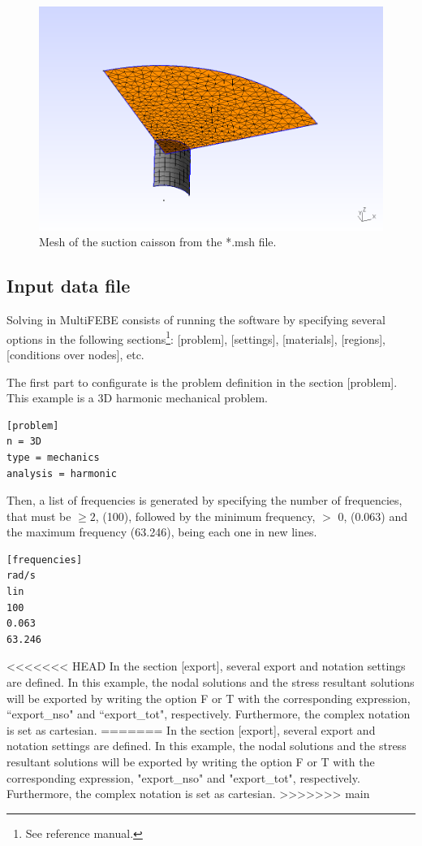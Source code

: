 \documentclass[a4]{article}
\begin{document}
\begin{figure}[tbh!]
	\centering
	\includegraphics[scale=0.6]{mesh.png}
	\caption{Mesh of the suction caisson from the *.msh file.}
	\label{fig:mesh}
\end{figure}

\subsection{Input data file}
Solving in MultiFEBE consists of running the software by specifying several options in the following sections\footnote{See reference manual.}: [problem], [settings], [materials], [regions], [conditions over nodes], etc.

The first part to configurate is the problem definition in the section [problem]. This example is a 3D harmonic mechanical problem.

\begin{Verbatim}	
[problem]
n = 3D
type = mechanics
analysis = harmonic
\end{Verbatim}

Then, a list of frequencies is generated by specifying the number of frequencies, that must be $\geq 2$, (100), followed by the minimum frequency, $>$ 0, (0.063) and the maximum frequency (63.246), being each one in new lines.

\begin{Verbatim}
[frequencies]
rad/s
lin
100
0.063
63.246
\end{Verbatim}

<<<<<<< HEAD
In the section [export], several export and notation settings are defined. In this example, the nodal solutions and the stress resultant solutions will be exported by writing the option F or T with the corresponding expression, ``export\_nso" and ``export\_tot", respectively. Furthermore, the complex notation is set as cartesian. 
=======
In the section [export], several export and notation settings are defined. In this example, the nodal solutions and the stress resultant solutions will be exported by writing the option F or T with the corresponding expression, "export\_nso" and "export\_tot", respectively. Furthermore, the complex notation is set as cartesian. 
>>>>>>> main
\end{document}
